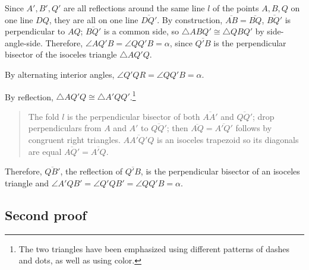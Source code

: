 Since $A', B', Q'$ are all reflections around the same line $l$ of the points $A,B,Q$ on one line $DQ$, they are all on one line $\overline{DQ'}$. By construction, $\overline{AB}=\overline{BQ}$, $\overline{BQ'}$ is perpendicular to $AQ$; $\overline{BQ'}$ is a common side, so $\triangle ABQ'\cong \triangle QBQ'$ by side-angle-side. Therefore, $\angle AQ'B=\angle QQ'B=\alpha$, since $\overline{Q'B}$ is the perpendicular bisector of the isoceles triangle $\triangle AQ'Q$.

By alternating interior angles, $\angle Q'QR=\angle QQ'B=\alpha$.

By reflection, $\triangle AQ'Q\cong \triangle A'QQ'$.\footnote{The two triangles have been emphasized using different patterns of dashes and dots, as well as using color.}
\begin{quote}
The fold $l$ is the perpendicular bisector of both $\overline{AA'}$ and $\overline{QQ'}$; drop perpendiculars from $A$ and $A'$ to $\overline{QQ'}$; then $\overline{AQ}=\overline{A'Q'}$ follows by congruent right triangles. $\overline{AA'Q'Q}$ is an isoceles trapezoid so its diagonals are equal $\overline{AQ'}=\overline{A'Q}$.
\end{quote}
Therefore, $\overline{QB'}$, the reflection of $\overline{Q'B}$, is the perpendicular bisector of an isoceles triangle and $\angle A'QB'=\angle Q'QB'=\angle QQ'B=\alpha$.


\subsection{Second proof}

